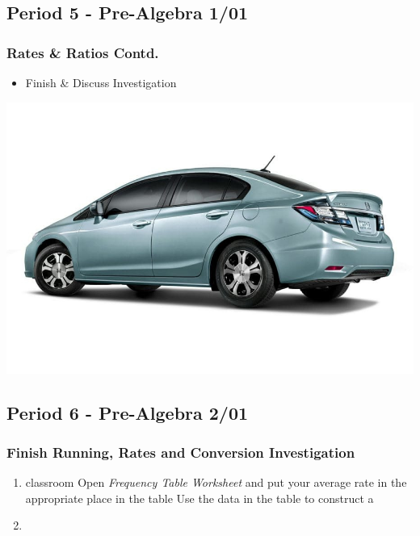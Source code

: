      \subsection[PA1/01]{Period 5 - Pre-Algebra 1/01}
     \begin{frame}[label=PA1_01]
     	    	\frametitle{Rates \& Ratios Contd.}

     	    	\begin{itemize}
     	    		\item Finish \& Discuss  Investigation
     	    		\rightarrowitem \mangahighlogo
     	        \end{itemize}
     	    	\vspace{-20pt}
     	    	\begin{center}
     	    		\includegraphics[width=0.5\linewidth]{Images/honda_civic}
     	    	\end{center}
     	    	\vspace{-20pt}
     	    \end{frame}

      \subsection[PA2/01]{Period 6 - Pre-Algebra 2/01}
      \begin{frame}[label=PA2_01]
      	   	\frametitle{Finish Running, Rates and Conversion Investigation}

      	   	\begin{enumerate}
      	   		\item {} classroom 
      	   		\rightarrowitem Open \emph{Frequency Table Worksheet} and put your average rate in the appropriate place in the table
      	   		\rightarrowitem Use the data in the table to construct a 
      	   		\item \mangahighlogo
      	   	\end{enumerate}

      \end{frame}
